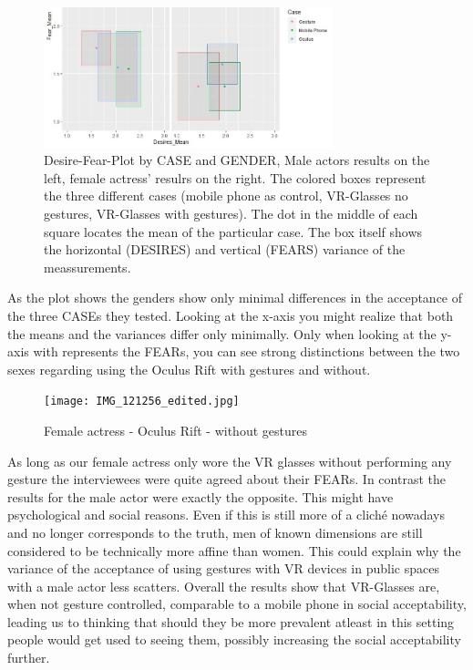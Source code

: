 \documentclass[sigchi]{acmart}
\begin{document}
\begin{figure}[h]
\includegraphics[width=84mm]{scmplot_v4_cut.jpg} 
\caption{Desire-Fear-Plot by CASE and GENDER, Male actors results on the left, female actress' resulrs on the right. The colored boxes represent the three different cases  (mobile phone as control, VR-Glasses no gestures, VR-Glasses with gestures). The dot in the middle of each square locates the mean of the particular case. The box itself shows the horizontal (DESIRES) and vertical (FEARS) variance of the meassurements.}
\end{figure}

As the plot shows the genders show only minimal differences in the acceptance of the three CASEs they tested. Looking at the x-axis you might realize that both the means and the variances differ only minimally. Only when looking at the y-axis with represents the FEARs, you can see strong distinctions between the two sexes regarding using the Oculus Rift with gestures and without.

\begin{figure}[h]
\texttt{[image: IMG\_121256\_edited.jpg]} 
\caption{Female actress - Oculus Rift - without gestures}
\end{figure}

 As long as our female actress only wore the VR glasses without performing any gesture the interviewees were quite agreed about their FEARs. In contrast the results for the male actor were exactly the opposite. This might have psychological and social reasons. Even if this is still more of a cliché nowadays and no longer corresponds to the truth, men of known dimensions are still considered to be technically more affine than women. This could explain why the variance of the acceptance of using gestures with VR devices in public spaces with a male actor less scatters.  Overall the results show that VR-Glasses are, when not gesture controlled, comparable to a mobile phone in social acceptability, leading us to thinking that should they be more prevalent atleast in this setting people would get used to seeing them, possibly increasing the social acceptability further.
\end{document}
